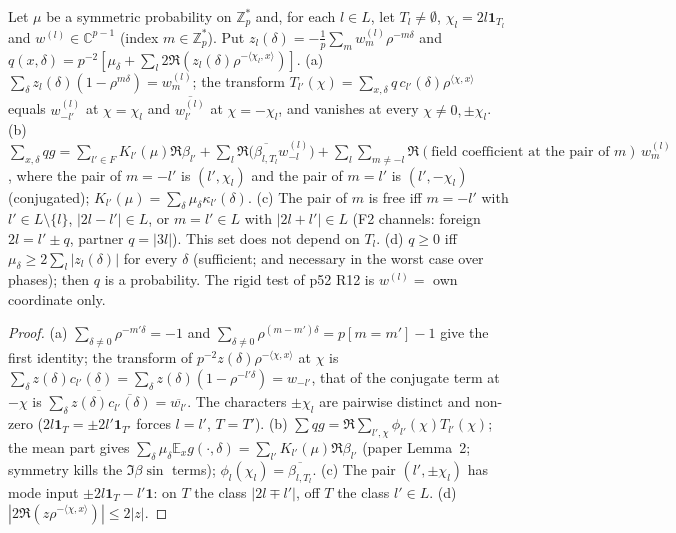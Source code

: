 \documentclass[11pt]{article}
\theoremstyle{remark}\newtheorem{remark}[theorem]{Remark}
\begin{document}
\begin{lemma}\label{l:tests}
Let $\mu$ be a symmetric probability on $\mathbb Z_p^*$ and, for each $l\in L$, let $T_l\ne\emptyset$, $\chi_l=2l\mathbf 1_{T_l}$ and
$w^{(l)}\in\mathbb C^{p-1}$ (index $m\in\mathbb Z_p^*$).  Put $z_l(\delta)=-\frac1p\sum_mw^{(l)}_m\rho^{-m\delta}$ and
$q(x,\delta)=p^{-2}[\mu_\delta+\sum_l2\Re(z_l(\delta)\rho^{-\langle\chi_l,x\rangle})]$.
(a) $\sum_\delta z_l(\delta)(1-\rho^{m\delta})=w^{(l)}_m$; the transform $T_{l'}(\chi)=\sum_{x,\delta}q\,c_{l'}(\delta)\rho^{\langle\chi,x\rangle}$
equals $w^{(l)}_{-l'}$ at $\chi=\chi_l$ and $\overline{w^{(l)}_{l'}}$ at $\chi=-\chi_l$, and vanishes at every $\chi\ne0,\pm\chi_l$.
(b) $\sum_{x,\delta}qg=\sum_{l'\in F}K_{l'}(\mu)\Re\beta_{l'}+\sum_l\Re\big(\overline{\beta_{l,T_l}}w^{(l)}_{-l}\big)
+\sum_l\sum_{m\ne-l}\Re(\text{field coefficient at the pair of }m)\,w^{(l)}_m$, where the pair of $m=-l'$ is $(l',\chi_l)$ and the pair of
$m=l'$ is $(l',-\chi_l)$ (conjugated); $K_{l'}(\mu)=\sum_\delta\mu_\delta\kappa_{l'}(\delta)$.
(c) The pair of $m$ is free iff $m=-l'$ with $l'\in L\setminus\{l\}$, $|2l-l'|\in L$, or $m=l'\in L$ with $|2l+l'|\in L$
(F2 channels: foreign $2l=l'\pm q$, partner $q=|3l|$).  This set does not depend on $T_l$.
(d) $q\ge0$ iff $\mu_\delta\ge2\sum_l|z_l(\delta)|$ for every $\delta$ (sufficient; and necessary in the worst case over phases);
then $q$ is a probability.  The rigid test of p52 R12 is $w^{(l)}=$ own coordinate only.
\end{lemma}
\begin{proof}
(a) $\sum_{\delta\ne0}\rho^{-m'\delta}=-1$ and $\sum_{\delta\ne0}\rho^{(m-m')\delta}=p[m=m']-1$ give the first identity; the transform of
$p^{-2}z(\delta)\rho^{-\langle\chi,x\rangle}$ at $\chi$ is $\sum_\delta z(\delta)c_{l'}(\delta)=\sum_\delta z(\delta)(1-\rho^{-l'\delta})=w_{-l'}$, that of
the conjugate term at $-\chi$ is $\overline{\sum_\delta z(\delta)\overline{c_{l'}(\delta)}}=\overline{w_{l'}}$.  The characters $\pm\chi_l$ are pairwise
distinct and non-zero ($2l\mathbf 1_T=\pm2l'\mathbf 1_{T'}$ forces $l=l'$, $T=T'$).
(b) $\sum qg=\Re\sum_{l',\chi}\phi_{l'}(\chi)T_{l'}(\chi)$; the mean part gives $\sum_\delta\mu_\delta\mathbb E_xg(\cdot,\delta)
=\sum_{l'}K_{l'}(\mu)\Re\beta_{l'}$ (paper Lemma~2; symmetry kills the $\Im\beta\sin$ terms); $\phi_l(\chi_l)=\overline{\beta_{l,T_l}}$.
(c) The pair $(l',\pm\chi_l)$ has mode input $\pm2l\mathbf 1_T-l'\mathbf 1$: on $T$ the class $|2l\mp l'|$, off $T$ the class $l'\in L$.
(d) $|2\Re(z\rho^{-\langle\chi,x\rangle})|\le2|z|$.
\end{proof}
\end{document}
